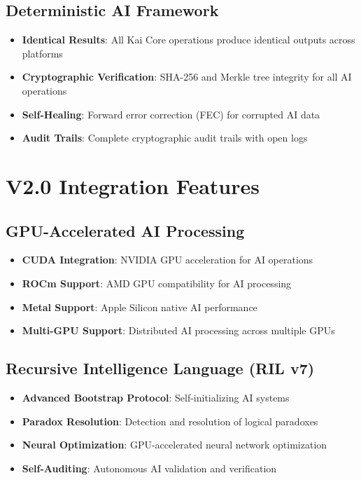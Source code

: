 \documentclass[12pt,a4paper]{article}
\begin{document}
\subsection{Deterministic AI Framework}
\begin{itemize}
    \item \textbf{Identical Results}: All Kai Core operations produce identical outputs across platforms
    \item \textbf{Cryptographic Verification}: SHA-256 and Merkle tree integrity for all AI operations
    \item \textbf{Self-Healing}: Forward error correction (FEC) for corrupted AI data
    \item \textbf{Audit Trails}: Complete cryptographic audit trails with open logs
\end{itemize}

\section{V2.0 Integration Features}

\subsection{GPU-Accelerated AI Processing}
\begin{itemize}
    \item \textbf{CUDA Integration}: NVIDIA GPU acceleration for AI operations
    \item \textbf{ROCm Support}: AMD GPU compatibility for AI processing
    \item \textbf{Metal Support}: Apple Silicon native AI performance
    \item \textbf{Multi-GPU Support}: Distributed AI processing across multiple GPUs
\end{itemize}

\subsection{Recursive Intelligence Language (RIL v7)}
\begin{itemize}
    \item \textbf{Advanced Bootstrap Protocol}: Self-initializing AI systems
    \item \textbf{Paradox Resolution}: Detection and resolution of logical paradoxes
    \item \textbf{Neural Optimization}: GPU-accelerated neural network optimization
    \item \textbf{Self-Auditing}: Autonomous AI validation and verification
\end{itemize}
\end{document}
